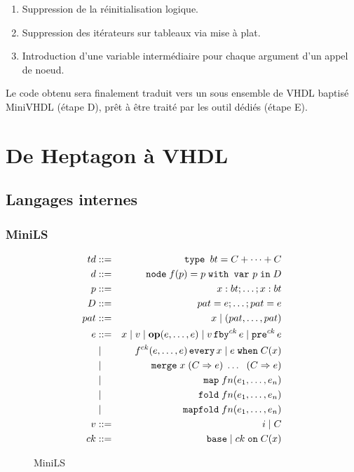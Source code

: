 \documentclass[a4paper]{article}
\newcommand{\LANG}{{\sc Heptagon}}
\newcommand{\p}[0]{\; \vert \;}
\newcommand{\mybox}[1]{\mbox{\tt{#1}}}
\newcommand{\Coloneqq}[0]{::=}
\newcommand{\Node}[4]{\mybox{node} \; f(#1) = #2 \; \mybox{with var} \
  #3 \; \mybox{in} \; #4}
\newcommand{\Op}[2]{\mybox{\bf{op}}(#1,\dots,#2)}
\newcommand{\Fby}[2]{#1 \, \mybox{fby}^{ck} \, #2}
\newcommand{\Pre}[1]{\mybox{pre}^{ck} \, #1}
\newcommand{\Every}[4]{#1^{ck}(#2,\dots,#3) \, \mybox{every} \, #4}
\newcommand{\When}[3]{#1 \; \mybox{when} \; #2(#3)}
\newcommand{\Merge}[5]{\mybox{merge} \; #1 \; (#2 \Rightarrow #3) \; \dots \; \
  (#4 \Rightarrow #5)}
\newcommand{\Base}[0]{\mybox{base}}
\newcommand{\On}[3]{#1 \; \mybox{on} \; #2 (#3)}
\newcommand{\Map}[3]{\mathtt{map} \; #1 n (#2,\dots,#3)}
\newcommand{\Fold}[3]{\mathtt{fold} \; #1 n (#2,\dots,#3)}
\newcommand{\Mapfold}[3]{\mathtt{mapfold} \; #1 n (#2,\dots,#3)}
\begin{document}
\renewcommand{\labelenumi}{\Alph{enumi}}
\begin{enumerate}
\item Suppression de la r\'einitialisation logique.
\item Suppression des it\'erateurs sur tableaux via mise \`a plat.
\item Introduction d'une variable interm\'ediaire pour chaque argument d'un appel
  de noeud.
\end{enumerate}

Le code obtenu sera finalement traduit vers un sous ensemble de VHDL baptis\'e
MiniVHDL (\'etape D), pr\^et \`a \^etre trait\'e par les outil d\'edi\'es (\'etape E).

\section{De \LANG{} \`a VHDL}

\subsection{Langages internes}

\subsubsection{MiniLS}
\label{sec:syn:mls}

\begin{figure}[h]
  \centering
  \begin{eqnarray*}
    td & \Coloneqq & \mybox{type } bt = C + \dots + C \\
    d & \Coloneqq & \Node{p}{p}{p}{D} \\
    p & \Coloneqq & x : bt; \dots; x : bt \\
    D & \Coloneqq & pat = e; \dots; pat = e \\
    pat & \Coloneqq & x \p (pat,\dots,pat) \\
    e & \Coloneqq & x \p v \p \Op{e}{e} \p \Fby{v}{e} \p \Pre{e} \\
    & \p & \Every{f}{e}{e}{x} \p \When{e}{C}{x} \\
    & \p & \Merge{x}{C}{e}{C}{e} \\
    & \p & \Map{f}{e_1}{e_n} \\
    & \p & \Fold{f}{e_1}{e_n} \\
    & \p & \Mapfold{f}{e_1}{e_n} \\
    v & \Coloneqq & i \p C \\
    ck & \Coloneqq & \Base \p \On{ck}{C}{x}
  \end{eqnarray*}
  \caption{MiniLS}
  \label{fig:mls}
\end{figure}
\end{document}
